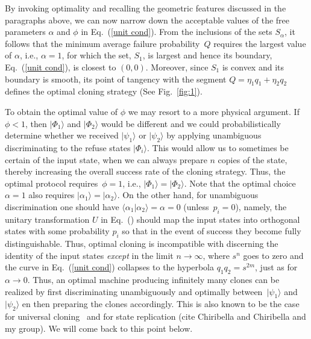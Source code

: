 \documentclass[aps,prl,twocolumn,showpacs]{revtex4}
\newcommand{\ke}[1]{|#1\rangle}
\begin{document}
By invoking optimality and recalling the geometric features discussed in the paragraphs above, we can now narrow down the acceptable values of the free parameters $\alpha$ and $\phi$ in Eq.~(\ref{unit cond}). From the inclusions of the sets $S_\alpha$, it follows that the minimum average failure probability~$Q$ requires the largest value of $\alpha$, i.e., $\alpha=1$, for which the set, $S_1$, is largest and hence its boundary, Eq.~(\ref{unit cond}), is closest to $(0,0)$. Moreover, since $S_1$ is convex and its boundary is smooth, its point of tangency with the segment $Q=\eta_1 q_1+\eta_2 q_2$ defines the optimal cloning strategy (See Fig.~\ref{fig:1}).

To obtain the optimal value of $\phi$ we may resort to a more physical argument. If $\phi < 1$, then $|\Phi_1\rangle$ and $|\Phi_2\rangle$ would be different and we could probabilistically determine whether we received $\ke{\psi_1}$ or $\ke{\psi_2}$ by applying unambiguous discriminating to the refuse states $\ke {\Phi_i}$.  This would allow us to sometimes be certain of the input state, when we can always prepare $n$ copies of the state,  thereby increasing the overall success rate of the cloning strategy. Thus, the optimal protocol requires~$\phi=1$, i.e., $|\Phi_1\rangle=|\Phi_2\rangle$. Note that the optimal choice~$\alpha=1$ also requires $|\alpha_1\rangle=|\alpha_2\rangle$. On the other hand, for unambiguous discrimination one should have $\langle\alpha_1|\alpha_2\rangle=\alpha=0$ (unless~$p_i=0$), {\color{red} namely, the unitary transformation $U$ in Eq.~() should map the input states into orthogonal states with some probability $p_i$ so that in the event of success they become fully distinguishable. Thus,} optimal cloning is incompatible with discerning the {\color{red}identity} of the input states {\em except} in the limit $n\to \infty$, where $s^n$ goes to zero and the curve in Eq.~(\ref{unit cond}) collapses to the hyperbola $q_1 q_2=s^{2m}$, just as for~$\alpha\to0$. Thus, an optimal machine producing infinitely many clones can be realized by first discriminating unambiguously and optimally between~$|\psi_1\rangle$ and $|\psi_2\rangle$ en then preparing the clones accordingly. This is also known to be the case for universal cloning~\cite{Bae} and for state replication (cite Chiribella and Chiribella and my group).  We will come back to this point below.

%
\end{document}
